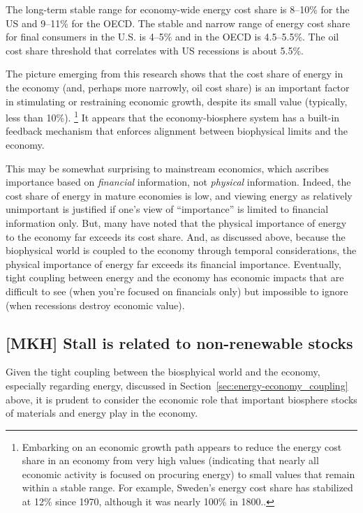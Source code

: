 The long-term stable range for economy-wide energy cost share 
is 8--10\% for the US and 9--11\% for the OECD. 
The stable and narrow range of energy cost share 
for final consumers in the U.S. is 4--5\% and in the OECD is 4.5--5.5\%.
The oil cost share threshold that correlates with US recessions 
is about 5.5\%.\cite{Murphy:2011jh}

The picture emerging from this research shows that 
the cost share of energy in the economy
(and, perhaps more narrowly, oil cost share)
is an important factor in stimulating or restraining economic growth,
despite its small value (typically, less than 10\%).%
	\footnote{
	Embarking on an economic growth path
	appears to reduce the energy cost share in an economy from very high values
	(indicating that nearly all economic activity is focused on procuring energy)
	to small values that remain within a stable range.
	For example, Sweden's energy cost share has stabilized at 12\% since 1970,
	although it was nearly 100\% in 1800.\cite{Stern:2012ey}.
	}
It appears that the economy-biosphere system has 
a built-in feedback mechanism that 
enforces alignment between biophysical limits and the economy.

This may be somewhat surprising to mainstream economics, 
which ascribes importance 
based on \emph{financial} information, 
not \emph{physical} information. 
Indeed, the cost share of energy in mature economies is low, 
and viewing energy as relatively unimportant is justified if
one's view of ``importance'' is limited to financial information only.
But, many have noted that the physical importance of energy to the economy 
far exceeds its cost share.\cite{Ayres:2013aa}
And, as discussed above, because the biophysical world is coupled 
to the economy through temporal considerations, 
the physical importance of energy far exceeds its financial importance.
Eventually, tight coupling between energy and the economy 
has economic impacts that are difficult to see (when you're focused on financials only)
but impossible to ignore (when recessions destroy economic value).


\subsection{[MKH] Stall is related to non-renewable stocks}
\label{sec:stall_non-renewable_stocks}

Given the tight coupling between the biosphyical world and the economy,
especially regarding energy,
discussed in Section~\ref{sec:energy-economy_coupling} above,
it is prudent to consider the economic role that important biosphere stocks
of materials and energy play in the economy.

